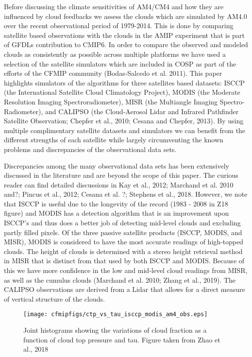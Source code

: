 \documentclass[11pt]{article}   	%
\begin{document}
Before discussing the climate sensitivities of AM4/CM4 and how they are influenced by cloud feedbacks we assess
the clouds which are simulated by AM4.0 over the recent observational period of 1979-2014.  This is done by comparing
satellite based observations with the clouds in the AMIP experiment that is part of GFDLs contribution to CMIP6.  In 
order to compare the observed and modeled clouds as consistently as possible across multiple platforms we have 
used a selection of the satellite simulators which are included in COSP as part of the efforts of the CFMIP community 
(Bodas-Salcedo et al. 2011).  This paper highlights simulators of the algorithms for three satellites based datasets: 
ISCCP (the International Satellite Cloud Climatology Project), MODIS (the Moderate Resolution Imaging Spectroradiometer), 
MISR (the Multiangle Imaging Spectro-Radiometer), and CALIPSO (the Cloud-Aerosol Lidar and Infrared Pathfinder 
Satellite Observation; Chepfer et al., 2010; Cesana and Chepfer, 2013).  By using multiple complimentary satellite 
datasets and simulators we can benefit from 
the different strengths of each satellite while largely circumventing the known problems and discrepancies of the 
observational data sets.      

Discrepancies among the many observational data sets has been extensively discussed in the literature and are 
beyond the scope of this paper.  The curious reader can find detailed discussions in Kay et al., 2012; 
Marchand et al. 2010 and?; Pincus et al., 2012; Cesana et al. ?; Stephens et al., 2018.  However, we note that ISCCP is useful due to 
the longevity of the record (1983 - 2008 in Z18 figure) and MODIS has a detection algorithm that is an improvement upon ISCCP's and
thus does a better job of detecting mid-level clouds and excluding partly filled pixels.   Of the three passive satellite products 
(ISCCP, MODIS, and MISR), MODIS is considered to have the most accurate readings of high-topped clouds.  
The height of clouds is determined with a stereo height retrieval method in MISR that is distinct from that used by
both ISCCP and MODIS.  Because of this we have more confidence in the low and mid-level cloud readings 
from MISR, as well as the cumulus clouds (Marchand et al. 2010; Zhang et al., 2019).   The CALIPSO observations
are derived from a Lidar that allows for a direct measure of vertical structure of the clouds.  

\begin{figure}
  \texttt{[image: cfmipfigs/ctp\_vs\_tau\_isccp\_modis\_am4\_obs.eps]}
  \caption{Joint histograms showing the variations of cloud fraction as a function of cloud top pressure and tau.
  Figure taken from Zhao et al., 2018}
  \label{fig:calipso_sim_vs_mod}
\end{figure}
\end{document}
